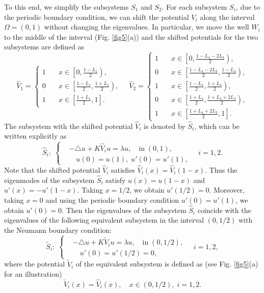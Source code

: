 \documentclass[a4paper,11pt]{article}
\begin{document}
To this end, we simplify the subsystems $S_1$ and $S_2$. For each subsystem $S_i$, due to the periodic boundary condition, we can shift the potential $V_i$ along the interval $\Omega = (0,1)$ without changing the eigenvalues. In particular, we move the well $W_i$ to the middle of the interval (Fig. \ref{fig5}(a)) and the shifted potentials for the two subsystems are defined as
\begin{equation*}
\hat{V}_1 = \left\{
\begin{split}
1 & \quad x \in \left[ 0, \frac{1 - L_1}{2} \right), \\
0 & \quad x \in \left[ \frac{1 - L_1}{2}, \frac{1 + L_1}{2} \right), \\
1 & \quad x \in \left[ \frac{1 + L_1}{2}, 1 \right].
\end{split}
\right.
\quad
\hat{V}_2 = \left\{
\begin{split}
1 & \quad x \in \left[ 0, \frac{1 - L_4 - 2 L_3}{2} \right), \\
0 & \quad x \in \left[ \frac{1 - L_4 - 2 L_3}{2}, \frac{1 - L_4}{2} \right), \\
1 & \quad x \in \left[ \frac{1 - L_4}{2}, \frac{1 + L_4}{2} \right), \\
0 & \quad x \in \left[ \frac{1 + L_4}{2}, \frac{1 + L_4 + 2 L_3}{2} \right), \\
1 & \quad x \in \left[ \frac{1 + L_4 + 2 L_3}{2}, 1 \right].
\end{split}
\right.
\end{equation*}
The subsystem with the shifted potential $\hat{V}_i$ is denoted by $\hat{S}_i$, which can be written explicitly as
\begin{equation*}
\hat{S}_i: \;
\left\{
\begin{split}
& -\triangle u + K\hat{V}_i u = \lambda u, \quad \textrm{in} \; (0, 1), \\
& \quad u(0) = u(1), \; u'(0) =  u'(1),
\end{split}
\right.
\quad
i = 1, 2.
\end{equation*}
Note that the shifted potential $\hat{V}_i$ satisfies $\hat{V}_i(x) = \hat{V}_i(1-x)$. Thus the eigenmodes of the subsystem $\hat{S}_i$ satisfy $u(x) = u(1-x)$ and $u'(x) = -u'(1-x)$. Taking $x = 1/2$, we obtain $u'(1/2) = 0$. Moreover, taking $x = 0$ and using the periodic boundary condition $u'(0) = u'(1)$, we obtain $u'(0) = 0$. Then the eigenvalues of the subsystem $\hat{S}_i$ coincide with the eigenvalues of the following equivalent subsystem in the interval $(0, 1/2)$ with the Neumann boundary condition:
\begin{equation}\label{tildeS}
\tilde{S}_i: \;
\left\{
\begin{split}
& -\triangle u + K\tilde{V}_i u = \lambda u, \quad \textrm{in} \; (0, 1/2), \\
& \quad u'(0) = u'(1/2) =  0,
\end{split}
\right.
\quad
i = 1, 2,
\end{equation}
where the potential $\tilde{V}_i$ of the equivalent subsystem is defined as (see Fig. \ref{fig5}(a) for an illustration)
\begin{equation*}
\tilde{V}_i(x) = \hat{V}_i(x), \quad x \in (0, 1/2), \; i = 1, 2.
\end{equation*}
\end{document}
